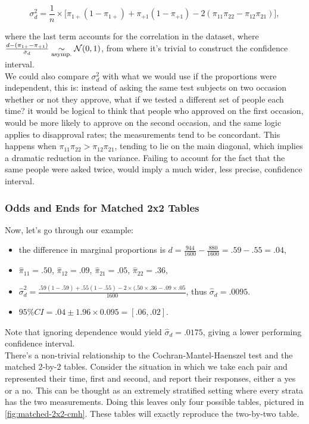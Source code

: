 \documentclass{homework}
\begin{document}
$$
\sigma^2_d = \frac{1}{n} \times \bigg[{\pi}_{1+}(1-{\pi}_{1+})+{\pi}_{+1}(1-{\pi}_{+1})-2({\pi}_{11}{\pi}_{22}-{\pi}_{12}{\pi}_{21})\bigg],
$$

where the last term accounts for the correlation in the dataset, where $\frac{d-({\pi}_{1+}-{\pi}_{+1})}{\hat{\sigma}_d} \underset{\textnormal{asymp.}}{\sim} \mathcal{N}(0,1)$, from where it's trivial to construct the confidence interval. \\

We could also compare $\sigma_d^2$ with what we would use if the proportions were independent, this is: instead of asking the same test subjects on two occasion whether or not they approve, what if we tested a different set of people each time? it would be logical to think that people who approved on the first occasion, would be more likely to approve on the second occasion, and the same logic applies to disapproval rates; the measurements tend to be concordant. This happens when ${\pi}_{11}{\pi}_{22} > {\pi}_{12}{\pi}_{21}$, tending to lie on the main diagonal, which implies a dramatic reduction in the variance. Failing to account for the fact that the same people were asked twice, would imply a much wider, less precise, confidence interval. 

\subsubsection{Odds and Ends for Matched 2x2 Tables}

Now, let's go through our example:

\begin{itemize}
    \item the difference in marginal proportions is $d= \frac{944}{1600}-\frac{880}{1600} = .59 - .55 = .04$,
    \item $\hat{\pi}_{11}=.50$, $\hat{\pi}_{12}=.09$, $\hat{\pi}_{21}=.05$, $\hat{\pi}_{22}=.36$, 
    \item $\hat{\sigma}_d^2 = \frac{.59(1-.59)+.55(1-.55) - 2\times(.50 \times .36 - .09 \times .05}{1600}$, thus $\hat{\sigma}_d = .0095$.
    \item $95\% CI = .04 \pm 1.96 \times 0.095 = [.06, .02]$.
\end{itemize}

Note that ignoring dependence would yield $\hat{\sigma}_d = .0175$, giving a lower performing confidence interval. \\

There's a non-trivial relationship to the Cochran-Mantel-Haenszel test and the matched 2-by-2 tables. Consider the situation in which we take each pair and represented their time, first and second, and report their responses, either a yes or a no. This can be thought as an extremely stratified setting where every strata has the two measurements. Doing this leaves only four possible tables, pictured in \ref{fig:matched-2x2-cmh}. These tables will exactly reproduce the two-by-two table. 
\end{document}
